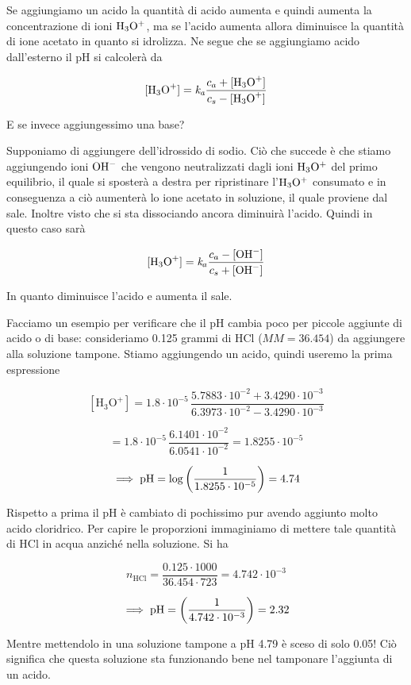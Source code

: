 Se aggiungiamo un acido la quantità di acido aumenta e quindi aumenta la concentrazione di ioni $\rm H_3O^+$, ma se l'acido aumenta allora diminuisce la quantità di ione acetato in quanto si idrolizza. Ne segue che se aggiungiamo acido dall'esterno il pH si calcolerà da

$${[\text{H}_3\text{O}^+]}=\textit{k}_\textit{a} \frac{c_a + \rm{[\text{H}_3\text{O}^+]}}{c_s - \rm{[\text{H}_3\text{O}^+]}}$$

E se invece aggiungessimo una base?

Supponiamo di aggiungere dell'idrossido di sodio. Ciò che succede è che stiamo aggiungendo ioni $\rm OH^-$ che vengono neutralizzati dagli ioni $\rm H_3O^+$ del primo equilibrio, il quale si sposterà a destra per ripristinare l'$\rm H_3O^+$ consumato e in conseguenza a ciò aumenterà lo ione acetato in soluzione, il quale proviene dal sale. Inoltre visto che si sta dissociando ancora diminuirà l'acido. Quindi in questo caso sarà

$${[\text{H}_3\text{O}^+]}=\textit{k}_a \frac{c_a - {[\text{OH}^-]}}{c_s + \rm{[\text{OH}^-]}}$$

In quanto diminuisce l'acido e aumenta il sale.

Facciamo un esempio per verificare che il pH cambia poco per piccole aggiunte di acido o di base: consideriamo 0.125 grammi di HCl ($MM=36.454$) da aggiungere alla soluzione tampone. Stiamo aggiungendo un acido, quindi useremo la prima espressione

$${[\text{H}_3\text{O}^+]}=1.8 \cdot 10^{-5}\,\frac{5.7883 \cdot 10^{-2} + 3.4290\cdot 10^{-3}}{6.3973 \cdot 10^{-2} - 3.4290 \cdot 10^{-3}}$$

$$=1.8 \cdot 10^{-5}\,\frac{6.1401 \cdot 10^{-2}}{6.0541 \cdot 10^{-2}}
=1.8255 \cdot 10^{-5}$$

$$\implies \rm pH=\log \left( \frac{1}{1.8255 \cdot 10^{-5}} \right)=4.74$$

Rispetto a prima il pH è cambiato di pochissimo pur avendo aggiunto molto acido cloridrico. Per capire le proporzioni immaginiamo di mettere tale quantità di HCl in acqua anziché nella soluzione. Si ha 

$$n_{\text{HCl}}=\frac{0.125 \cdot 1000}{36.454 \cdot 723}
=4.742 \cdot 10^{-3}$$

$$\implies \rm pH=\left( \frac{1}{4.742 \cdot 10^{-3}} \right)=2.32$$

Mentre mettendolo in una soluzione tampone a pH 4.79 è sceso di solo 0.05! Ciò significa che questa soluzione sta funzionando bene nel tamponare l'aggiunta di un acido.

